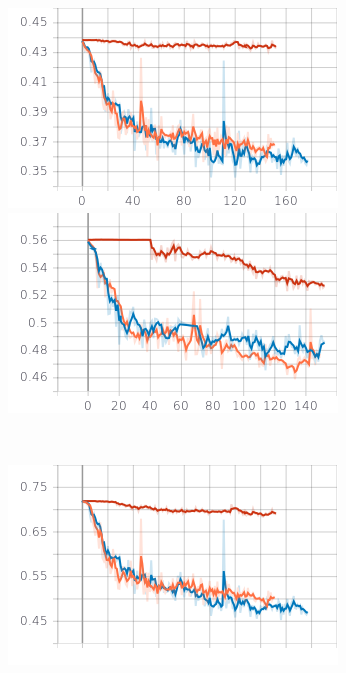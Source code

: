 \documentclass{article}
\begin{document}
\begin{figure}[hbt!]
	\begin{minipage}{.35\textwidth}
	  \centering
	  \includegraphics[width=\linewidth]{images/doa_score_ov1.png}
	
	\end{minipage}%
	\begin{minipage}{.35\textwidth}
	  \centering
	  \includegraphics[width=\linewidth]{images/doa_score_ov2.png}
	\end{minipage}\\
	\vspace{1em}
	\begin{minipage}{.35\textwidth}
	  \centering
	  \includegraphics[width=\linewidth]{images/seld_score_ov1.png}
	

\end{minipage}
\end{figure}
\end{document}
